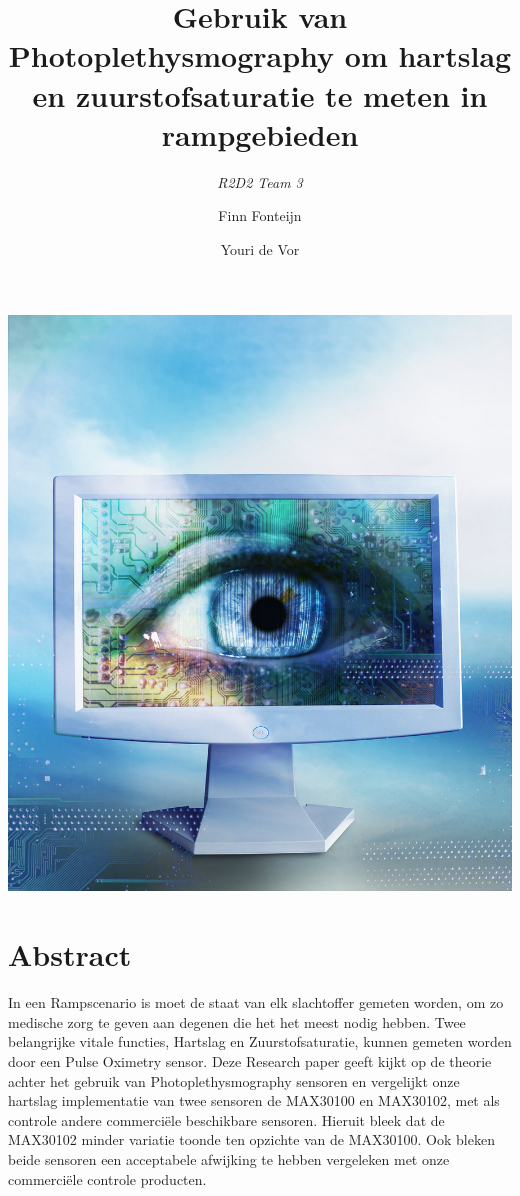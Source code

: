 \documentclass[11pt]{article}
\title{Gebruik van Photoplethysmography om hartslag en zuurstofsaturatie te meten in rampgebieden}
\author{\emph{R2D2 Team 3} \and Finn Fonteijn \and Youri de Vor}
\begin{document}
    \begin{titlepage}
        \centering
        \maketitle
        \includegraphics[height=0.6\textheight]{Images/vision.jpg}
        \clearpage
    \end{titlepage}


    \clearpage
    \tableofcontents

    \clearpage

    \section{Abstract}\label{sec:abstract}
In een Rampscenario is moet de staat van elk slachtoffer gemeten worden, om zo medische zorg te geven aan degenen die het het meest nodig hebben. Twee belangrijke vitale functies, Hartslag en Zuurstofsaturatie, kunnen gemeten worden door een Pulse Oximetry sensor. Deze Research paper geeft kijkt op de theorie achter het gebruik van Photoplethysmography sensoren en vergelijkt onze hartslag implementatie van twee sensoren de MAX30100 en MAX30102, met als controle andere commerciële beschikbare sensoren. Hieruit bleek dat de MAX30102 minder variatie toonde ten opzichte van de MAX30100. Ook bleken beide sensoren een acceptabele afwijking te hebben vergeleken met onze commerciële controle producten.	
\end{document}
